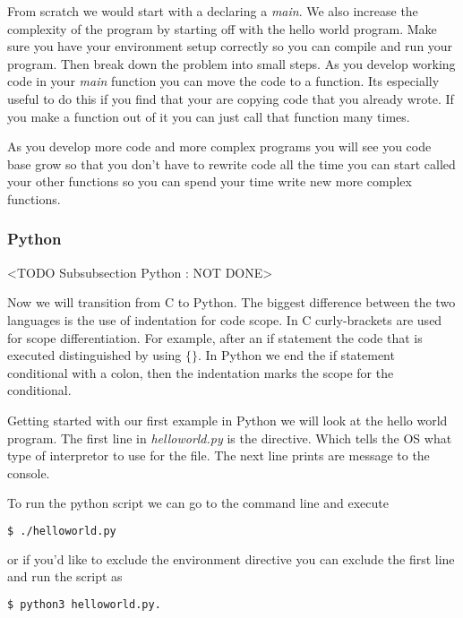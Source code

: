 From scratch we would start with a declaring a \emph{main}. We also increase the complexity of the program by starting off with the hello world program. Make sure you have your environment setup correctly so you can compile and run your program. Then break down the problem into small steps. As you develop working code in your \emph{main} function you can move the code to a function. Its especially useful to do this if you find that your are copying code that you already wrote. If you make a function out of it you can just call that function many times. 

As you develop more code and more complex programs you will see you code base grow so that you don't have to rewrite code all the time you can start called your other functions so you can spend your time write new more complex functions. 

\subsubsection{Python}
	<TODO Subsubsection  Python : NOT DONE>

Now we will transition from C to Python. The biggest difference between the two languages is the use of indentation for code scope. In C curly-brackets are used for scope differentiation. For example, after an if statement the code that is executed distinguished by using $\{\}$. In Python we end the if statement conditional with a colon, then the indentation marks the scope for the conditional. 

Getting started with our first example in Python we will look at the hello world program. The first line in \emph{helloworld.py} is the directive. Which tells the \ac{OS} what type of interpretor to use for the file. The next line prints are message to the console. 



To run the python script we can go to the command line and execute

\begin{lstlisting}[language=bash]
    $ ./helloworld.py
\end{lstlisting}

or if you'd like to exclude the environment directive you can exclude the first line and run the script as

\begin{lstlisting}[language=bash]
    $ python3 helloworld.py.
\end{lstlisting}

